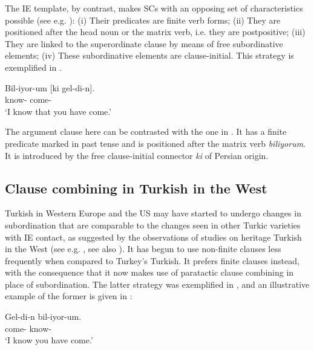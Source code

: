 \documentclass[output=paper,colorlinks,citecolor=brown]{langscibook}
\begin{document}
The IE template, by contrast, makes SCs with an opposing set of characteristics possible (see e.g. \cites[409--411, 457--460, 463--465]{GokselKerslake2005}[65--66]{Johanson.1998}[867--868, 894--899]{Johanson.2021}{Kerslake.2007}[3, 46, 60, 321--323, 439--440, 443]{Kornfilt1997}): (i) Their predicates are finite verb forms; (ii) They are positioned after the head noun or the matrix verb, i.e. they are postpositive; (iii) They are linked to the superordinate clause by means of free subordinative elements; (iv) These subordinative elements are clause-initial. This strategy is exemplified in .

\ea\label{ex:keskin:IE_tmpl}
\gll Bil-iyor-um $[$ki gel-di-n$]$.\\
know-\Sg{} \hphantom{[}\Conn{} come-\Sg{}\\
\glt `I know that you have come.'
\z

\noindent
The argument clause here can be contrasted with the one in . It has a finite predicate marked in past tense and is positioned after the matrix verb \textit{biliyorum}. It is introduced by the free clause-initial connector \textit{ki} of Persian origin.

\subsection{Clause combining in Turkish in the West}
\label{sec:keskin:clause_comb_west}

Turkish in Western Europe and the US may have started to undergo changes in subordination that are comparable to the changes seen in other Turkic varieties with IE contact, as suggested by the observations of studies on heritage Turkish in the West (see e.g. \citealt{Bayram.2013,Iefremenko.Özsoy.Schroeder.ICTL,Iefremenko.Schroeder.Kornfilt.conv,Karakoc.finite,OnarValk.2015,Ozsoyetal.combining,Schroeder.cc.minority,Schroeder.Iefremenko.pilot,TreffersDalleretal.2006,Turan.2020}, see also \cite{chapters/08}). It has begun to use non-finite clauses less frequently when compared to Turkey's Turkish. It prefers finite clauses instead, with the consequence that it now makes use of paratactic clause combining in place of subordination. The latter strategy was exemplified in , and an illustrative example of the former is given in :

\ea\label{ex:keskin:finite}
\gll Gel-di-n bil-iyor-um.\\
come-\Sg{} know-\Sg\\
\glt `I know you have come.'
\z
\end{document}
